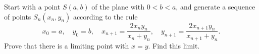 Start with a point $S(a, b)$ of the plane with $0 < b < a$, and generate a sequence of points $S_n(x_n, y_n)$ according to the rule
\[ x_0 = a,\quad y_0 = b,\quad x_{n+1} = \frac{2x_ny_n}{x_n + y_n},\quad y_{n+1} = \frac{2x_{n+1}y_n}{x_{n+1} + y_n}. \]
Prove that there is a limiting point with $x = y$. Find this limit.
